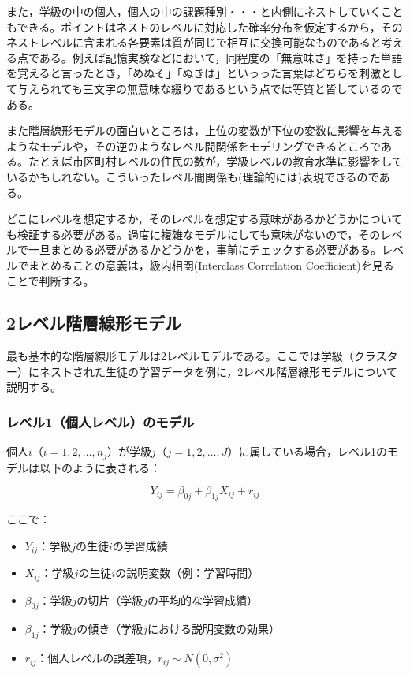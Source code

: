 \documentclass[
  a4paper,
]{ltjsbook}
\providecommand{\tightlist}{%
  \setlength{\itemsep}{0pt}\setlength{\parskip}{0pt}}
\begin{document}
また，学級の中の個人，個人の中の課題種別・・・と内側にネストしていくこともできる。ポイントはネストのレベルに対応した確率分布を仮定するから，そのネストレベルに含まれる各要素は質が同じで相互に交換可能なものであると考える点である。例えば記憶実験などにおいて，同程度の「無意味さ」を持った単語を覚えると言ったとき，「めぬそ」「ぬきは」といっった言葉はどちらを刺激として与えられても三文字の無意味な綴りであるという点では等質と皆しているのである。

また階層線形モデルの面白いところは，上位の変数が下位の変数に影響を与えるようなモデルや，その逆のようなレベル間関係をモデリングできるところである。たとえば市区町村レベルの住民の数が，学級レベルの教育水準に影響をしているかもしれない。こういったレベル間関係も(理論的には)表現できるのである。

どこにレベルを想定するか，そのレベルを想定する意味があるかどうかについても検証する必要がある。過度に複雑なモデルにしても意味がないので，そのレベルで一旦まとめる必要があるかどうかを，事前にチェックする必要がある。レベルでまとめることの意義は，級内相関(Interclass
Correlation Coefficient)を見ることで判断する。

\subsection{2レベル階層線形モデル}\label{ux30ecux30d9ux30ebux968eux5c64ux7ddaux5f62ux30e2ux30c7ux30eb}

最も基本的な階層線形モデルは2レベルモデルである。ここでは学級（クラスター）にネストされた生徒の学習データを例に，2レベル階層線形モデルについて説明する。

\subsubsection{レベル1（個人レベル）のモデル}\label{ux30ecux30d9ux30eb1ux500bux4ebaux30ecux30d9ux30ebux306eux30e2ux30c7ux30eb}

個人\(i\)（\(i = 1, 2, \ldots, n_j\)）が学級\(j\)（\(j = 1, 2, \ldots, J\)）に属している場合，レベル1のモデルは以下のように表される：

\[
Y_{ij} = \beta_{0j} + \beta_{1j}X_{ij} + r_{ij}
\]

ここで：

\begin{itemize}
\tightlist
\item
  \(Y_{ij}\)：学級\(j\)の生徒\(i\)の学習成績
\item
  \(X_{ij}\)：学級\(j\)の生徒\(i\)の説明変数（例：学習時間）
\item
  \(\beta_{0j}\)：学級\(j\)の切片（学級\(j\)の平均的な学習成績）
\item
  \(\beta_{1j}\)：学級\(j\)の傾き（学級\(j\)における説明変数の効果）
\item
  \(r_{ij}\)：個人レベルの誤差項，\(r_{ij} \sim N(0, \sigma^2)\)
\end{itemize}
\end{document}
